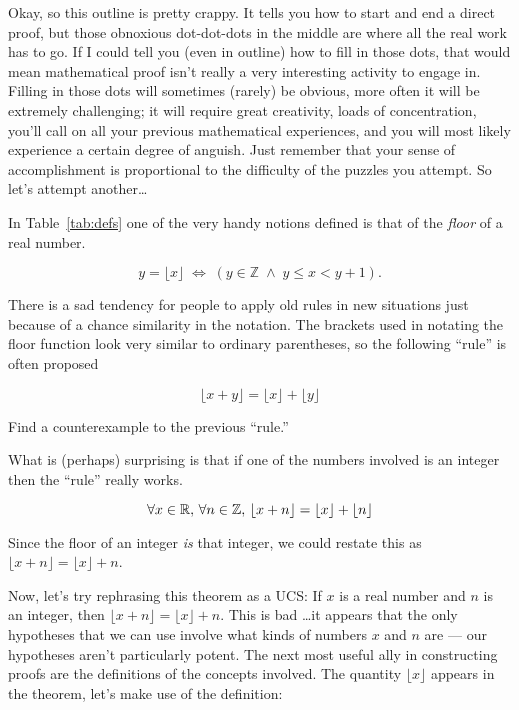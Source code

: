 Okay, so this outline is pretty crappy.  It tells you how to start and 
end a direct proof, but those obnoxious dot-dot-dots in the middle are 
where all the real work has to go.  If I could tell you (even in outline) 
how to fill in those dots, that would mean mathematical proof isn't really 
a very interesting activity to engage in.  Filling in those dots will 
sometimes (rarely) be obvious, more often it will be extremely challenging; 
it will require great creativity, loads of concentration, you'll call on 
all your previous mathematical experiences, and you will most likely
experience a certain degree of anguish.  Just remember that your sense 
of accomplishment is proportional to the difficulty of the puzzles you 
attempt.  So let's attempt another\ldots

In Table~\ref{tab:defs} one of the very handy notions defined is that 
of the \emph{floor} of a real number. 

\[ y = \lfloor x \rfloor \; \iff \; (y \in \mathbb Z \; \land \; y \leq x < y+1).\]

There is a sad tendency for people to apply old rules in new situations 
just because of a chance similarity in the notation.  The brackets used 
in notating the floor function look very similar to ordinary parentheses, 
so the following ``rule'' is often proposed

\[ \lfloor x + y \rfloor = \lfloor x \rfloor + \lfloor y \rfloor \]

\begin{exer} 
Find a counterexample to the previous ``rule.''
\end{exer}

What is (perhaps) surprising is that if one of the numbers involved is an
integer then the ``rule'' really works.

\begin{thm}
\[ \forall x \in {\mathbb R}, \, \forall n \in {\mathbb Z}, \, 
\lfloor x + n \rfloor = \lfloor x \rfloor + \lfloor n \rfloor \]
\end{thm}

Since the floor of an integer {\em is} that integer, we could restate this
as $ \lfloor x + n \rfloor = \lfloor x \rfloor +  n$. 

Now, let's try rephrasing this theorem as a UCS:  If $x$ is a real number
and $n$ is an integer, then $\lfloor x + n \rfloor = \lfloor x \rfloor +  n$.
This is bad \ldots it appears that the only hypotheses that we can use
involve what kinds of numbers $x$ and $n$ are --- our hypotheses aren't
particularly potent.  The next most useful ally in constructing proofs
are the definitions of the concepts involved.  The quantity 
$\lfloor x \rfloor$ appears in the theorem, let's make
use of the definition:

